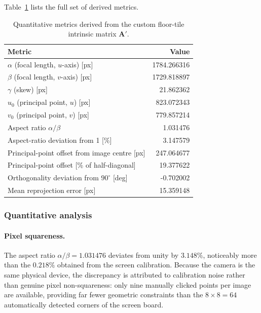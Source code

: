 \documentclass[11pt,a4paper]{article}
\begin{document}
Table~\ref{tab:custom_metrics} lists the full set of derived metrics.

\begin{table}[htbp]
\centering
\caption{Quantitative metrics derived from the custom floor-tile intrinsic
         matrix $\mathbf{A}'$.}
\label{tab:custom_metrics}
\begin{tabular}{lr}
\hline
Metric & {Value} \\
\hline
$\alpha$ (focal length, $u$-axis) [px]     & 1784.266316 \\
$\beta$ (focal length, $v$-axis) [px]      & 1729.818897 \\
$\gamma$ (skew) [px]                       & 21.862362   \\
$u_0$ (principal point, $u$) [px]          & 823.072343  \\
$v_0$ (principal point, $v$) [px]          & 779.857214  \\
Aspect ratio $\alpha/\beta$                & 1.031476    \\
Aspect-ratio deviation from 1 [\%]        & 3.147579    \\
Principal-point offset from image centre [px] & 247.064677 \\
Principal-point offset [\% of half-diagonal]  & 19.377622  \\
Orthogonality deviation from $90^\circ$ [deg] & -0.702002  \\
Mean reprojection error [px]               & 15.359148   \\
\hline
\end{tabular}
\end{table}

\subsubsection*{Quantitative analysis}

\paragraph{Pixel squareness.}
The aspect ratio $\alpha/\beta = 1.031476$ deviates from unity by
$3.148\%$, noticeably more than the $0.218\%$ obtained from the screen
calibration.  Because the camera is the same physical device, the
discrepancy is attributed to calibration noise rather than genuine
pixel non-squareness: only nine manually clicked points per image are
available, providing far fewer geometric constraints than the
$8 \times 8 = 64$ automatically detected corners of the screen board.
\end{document}
